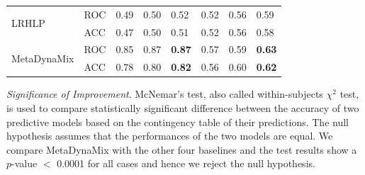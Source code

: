 \begin{table}[t]
\begin{tabular}{ll|p{1cm}|p{1cm}|p{1cm}||p{1cm}|p{1cm}|p{1cm}|}
\multicolumn{1}{|l|}{\multirow{2}{*}{LRHLP}}  & ROC  &   0.49   &   0.50   &   0.52    &    0.52     &   0.56   &   0.59      \\ \cline{2-8}
\multicolumn{1}{|l|}{}  & ACC  & 0.47 & 0.50  & 0.51   & 0.52  & 0.56  &  0.58  \\ \hline\hline

\multicolumn{1}{|l|}{\multirow{2}{*}{MetaDynaMix}}  & ROC  & 0.85 &  0.87 & \textbf{0.87}   &  0.57  & 0.59 &  \textbf{0.63}  \\ \cline{2-8}
\multicolumn{1}{|l|}{}  & ACC  & 0.78 & 0.80 & \textbf{0.82}   & 0.56  &  0.60  &   \textbf{0.62} \\ \hline

\end{tabular}
\end{table}





\textit{Significance of Improvement}. McNemar's test, also called within-subjects $\chi^2$ test, is used to compare statistically significant difference between the accuracy of two predictive models based on the contingency table of their predictions. The null hypothesis assumes that the performances of the two models are equal. We compare MetaDynaMix with the other four baselines and the test results show a $p$-value $<$ 0.0001 for all cases and hence we reject the null hypothesis.

%    
%    
%
    
    
